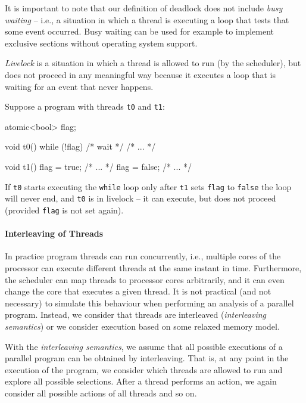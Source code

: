 It is important to note that our definition of deadlock does not include
\emph{busy waiting} -- i.e., a situation in which a thread is executing a loop
that tests that some event occurred.
Busy waiting can be used for example to implement exclusive sections without
operating system support.

\begin{definition}[Livelock]\label{def:livelock}
    \emph{Livelock} is a situation in which a thread is allowed to run (by
    the scheduler), but does not proceed in any meaningful way because it
    executes a loop that is waiting for an event that never happens.%
    \begin{marginnote}
      Suppose a program with threads \texttt{t0} and \texttt{t1}:

      \medskip
      \begin{cppcode}
        atomic<bool> flag;

        void t0() {
          while (!flag) {
            /* wait */
          }
          /* ... */
        }

        void t1() {
          flag = true;
          /* ... */
          flag = false;
          /* ... */
        }
      \end{cppcode}
      \smallskip

      If \texttt{t0} starts executing the \texttt{while} loop only after \texttt{t1} sets \texttt{flag} to \texttt{false} the loop will never end, and \texttt{t0} is in livelock -- it can execute, but does not proceed (provided \texttt{flag} is not set again).
    \end{marginnote}
\end{definition}

\paragraph{Interleaving of Threads}

In practice program threads can run concurrently, i.e., multiple cores of the
processor can execute different threads at the same instant in time.
Furthermore, the scheduler can map threads to processor cores arbitrarily, and
it can even change the core that executes a given thread.
It is not practical (and not necessary) to simulate this behaviour when
performing an analysis of a parallel program.
Instead, we consider that threads are interleaved (\emph{interleaving
semantics}) or we consider execution based on some relaxed memory model.

\begin{definition}
    With the \emph{interleaving semantics}, we assume that all possible
    executions of a parallel program can be obtained by interleaving.
    That is, at any point in the execution of the program, we consider which
    threads are allowed to run and explore all possible selections.
    After a thread performs an action, we again consider all possible actions
    of all threads and so on.
\end{definition}



